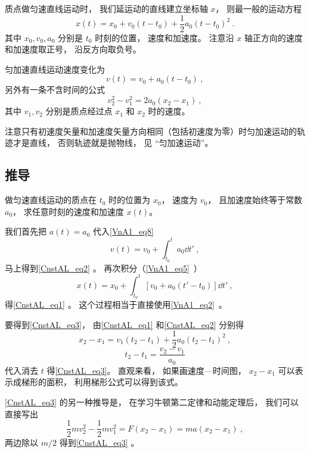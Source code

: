 

质点做匀速直线运动时， 我们延运动的直线建立坐标轴 $x$， 则最一般的运动方程
\begin{equation}\label{CnstAL_eq1}
x(t) = x_0 + v_0 (t - t_0) +  \frac12 a_0 (t - t_0)^2~.
\end{equation}
其中 $x_0, v_0, a_0$ 分别是 $t_0$ 时刻的位置， 速度和加速度。 注意沿 $x$ 轴正方向的速度和加速度取正号， 沿反方向取负号。

匀加速直线运动速度变化为
\begin{equation}\label{CnstAL_eq2}
v(t) = v_0 + a_0 (t - t_0)~,
\end{equation}
另外有一条不含时间的公式
\begin{equation}\label{CnstAL_eq3}
v_2^2 - v_1^2 = 2a_0 (x_2 - x_1)~,
\end{equation}
其中 $v_1, v_2$ 分别是质点经过点 $x_1$ 和 $x_2$ 时的速度。

注意只有初速度矢量和加速度矢量方向相同（包括初速度为零）时匀加速运动的轨迹才是直线， 否则轨迹就是抛物线， 见 “匀加速运动”。

\subsection{推导}
做匀速直线运动的质点在 $t_0$ 时的位置为 $x_0$， 速度为 $v_0$， 且加速度始终等于常数 $a_0$， 求任意时刻的速度和加速度 $x(t)$。

我们首先把 $a(t) = a_0$ 代入\autoref{VnA1_eq8}~
\begin{equation}
v(t) = v_0 + \int_{t_0}^t a_0 \dd{t'}~,
\end{equation}
马上得到\autoref{CnstAL_eq2} 。 再次积分（\autoref{VnA1_eq5}~）
\begin{equation}
x(t) = x_0 + \int_{t_0}^t [v_0 + a_0 (t' - t_0)] \dd{t'}~,
\end{equation}
得\autoref{CnstAL_eq1} 。 这个过程相当于直接使用\autoref{VnA1_eq2}~。

要得到\autoref{CnstAL_eq3}， 由\autoref{CnstAL_eq1} 和\autoref{CnstAL_eq2} 分别得
\begin{equation}
x_2 - x_1 = v_1 (t_2 - t_1) +  \frac12 a_0 (t_2 - t_1)^2~,
\end{equation}
\begin{equation}
t_2 - t_1 = \frac{v_2 - v_1}{a_0}
\end{equation}
代入消去 $t$ 得\autoref{CnstAL_eq3}。 直观来看， 如果画速度—时间图， $x_2 - x_1$ 可以表示成梯形的面积， 利用梯形公式可以得到该式。

\autoref{CnstAL_eq3} 的另一种推导是， 在学习牛顿第二定律和动能定理后， 我们可以直接写出
\begin{equation}
\frac{1}{2}mv_2^2 - \frac{1}{2}mv_1^2 = F (x_2 - x_1) = ma (x_2 - x_1)~,
\end{equation}
两边除以 $m/2$ 得到\autoref{CnstAL_eq3} 。
